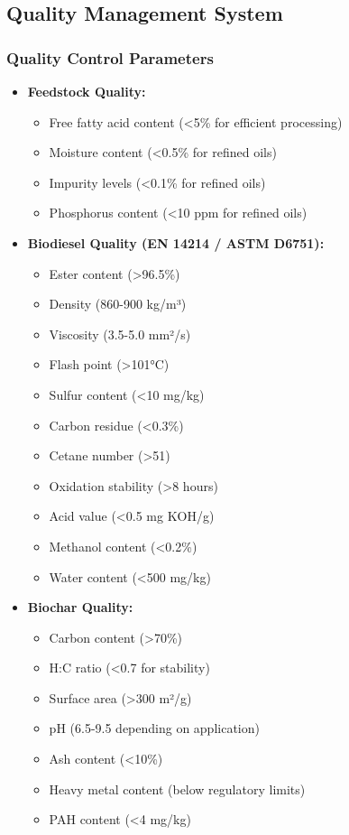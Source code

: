 \subsection{Quality Management System}

\subsubsection{Quality Control Parameters}
\begin{itemize}
    \item \textbf{Feedstock Quality:}
    \begin{itemize}
        \item Free fatty acid content (<5\% for efficient processing)
        \item Moisture content (<0.5\% for refined oils)
        \item Impurity levels (<0.1\% for refined oils)
        \item Phosphorus content (<10 ppm for refined oils)
    \end{itemize}
    
    \item \textbf{Biodiesel Quality (EN 14214 / ASTM D6751):}
    \begin{itemize}
        \item Ester content (>96.5\%)
        \item Density (860-900 kg/m³)
        \item Viscosity (3.5-5.0 mm²/s)
        \item Flash point (>101°C)
        \item Sulfur content (<10 mg/kg)
        \item Carbon residue (<0.3\%)
        \item Cetane number (>51)
        \item Oxidation stability (>8 hours)
        \item Acid value (<0.5 mg KOH/g)
        \item Methanol content (<0.2\%)
        \item Water content (<500 mg/kg)
    \end{itemize}
    
    \item \textbf{Biochar Quality:}
    \begin{itemize}
        \item Carbon content (>70\%)
        \item H:C ratio (<0.7 for stability)
        \item Surface area (>300 m²/g)
        \item pH (6.5-9.5 depending on application)
        \item Ash content (<10\%)
        \item Heavy metal content (below regulatory limits)
        \item PAH content (<4 mg/kg)
    \end{itemize}
\end{itemize}

